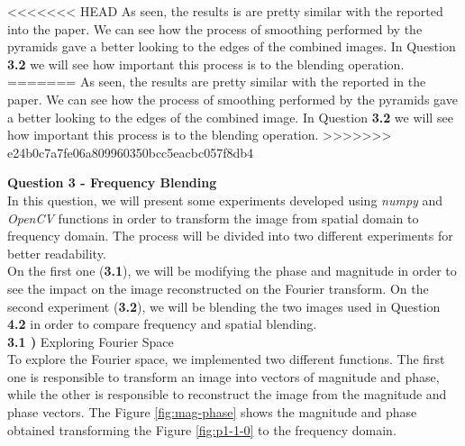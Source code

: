 \documentclass[12pt,a4paper]{article}
\begin{document}
<<<<<<< HEAD
As seen, the results is are pretty similar with the reported into the paper. We can see how the process of smoothing performed by the pyramids gave a better looking to the edges of the combined images. In Question \textbf{3.2} we will see how important this process is to the blending operation. 
=======
As seen, the results are pretty similar with the reported in the paper. We can see how the process of smoothing performed by the pyramids gave a better looking to the edges of the combined image. In Question \textbf{3.2} we will see how important this process is to the blending operation.
>>>>>>> e24b0c7a7fe06a809960350bcc5eacbc057f8db4

\newpage

\textbf{\LARGE Question 3 - Frequency Blending} \\

In this question, we will present some experiments developed using \emph{numpy} and \emph{OpenCV} functions in order to transform the image from spatial domain to frequency domain. The process will be divided into two different experiments for better readability. \\

On the first one (\textbf{3.1}), we will be modifying the phase and magnitude in order to see the impact on the image reconstructed on the Fourier transform. On the second experiment (\textbf{3.2}), we will be blending the two images used in Question \textbf{4.2} in order to compare frequency and spatial blending. \\

\textbf{3.1 )} Exploring Fourier Space \\

To explore the Fourier space, we implemented two different functions. The first one is responsible to transform an image into vectors of magnitude and phase, while the other is responsible to reconstruct the image from the magnitude and phase vectors. The Figure \ref{fig:mag-phase} shows the magnitude and phase obtained transforming the Figure \ref{fig:p1-1-0} to the frequency domain. \\
\end{document}
